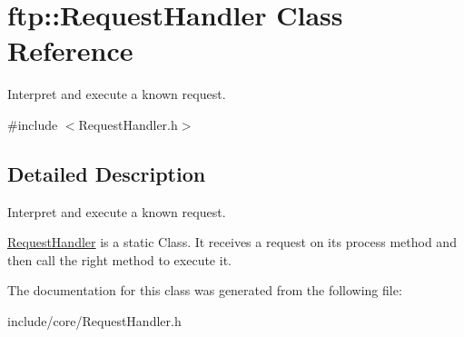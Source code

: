 \hypertarget{classftp_1_1_request_handler}{\section{ftp\-:\-:Request\-Handler Class Reference}
\label{classftp_1_1_request_handler}
}


Interpret and execute a known request.  




{\ttfamily \#include $<$Request\-Handler.\-h$>$}



\subsection{Detailed Description}
Interpret and execute a known request. 

\hyperlink{classftp_1_1_request_handler}{Request\-Handler} is a static Class. It receives a request on its process method and then call the right method to execute it. 

The documentation for this class was generated from the following file\-:\begin{DoxyCompactItemize}
\item 
include/core/Request\-Handler.\-h\end{DoxyCompactItemize}

